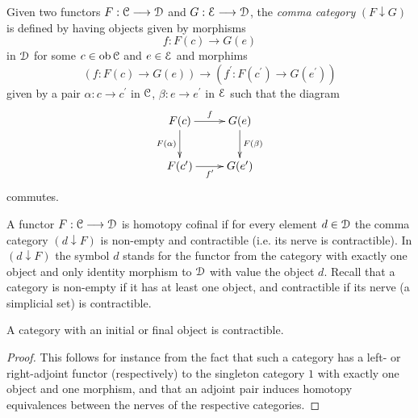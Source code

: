     \begin{defn}\label{def_comma_category}
      Given two functors $F:\mathcal{C} \longrightarrow \mathcal{D}$ and $G: \mathcal{E} \longrightarrow \mathcal{D}$, the \emph{comma category} $(F \downarrow G)$ is defined by having objects given by morphisms 
      \begin{displaymath}
        f \colon F(c) \to G(e)
      \end{displaymath}
      in $\mathcal{D}$ for some $c \in \operatorname{ob} \mathcal{C}$ and $e \in \mathcal{E}$ and morphims 
      \begin{displaymath}
        (f \colon F(c) \to G(e)) \to (f^\prime \colon F(c^\prime) \to G(e^\prime) )
      \end{displaymath}
      given by a pair $\alpha \colon c \to c^\prime$ in $\mathcal{C}$, $\beta \colon e \to e^\prime$ in $\mathcal{E}$ such that the diagram
      \begin{displaymath}
          \xymatrix{
            F(c)
              \ar[r]^{f}
              \ar[d]_{F(\alpha)}
            &
            G(e)
              \ar[d]^{F(\beta)}
            \\
            F(c^\prime) 
              \ar[r]_{f^\prime}
            &
            G(e^\prime)
          }
      \end{displaymath}
      commutes.
    \end{defn}
    \begin{defn}\label{def_homotopy_cofinal}
      A functor $F: \mathcal{C} \longrightarrow \mathcal{D}$ is homotopy cofinal if for every element $d \in
      \mathcal{D}$ the comma category $(d \downarrow F)$ is non-empty and contractible
      (i.e. its nerve is contractible).  In $(d \downarrow F)$ the symbol $d$
      stands for the functor from the category with exactly one object and only
      identity morphism to $\mathcal{D}$ with value the object $d$.  Recall that a
      category is non-empty if it has at least one object, and contractible if
      its nerve (a simplicial set) is contractible.
    \end{defn}
    \begin{lem}\label{lem_category_contractible_if_has_initial_object}
      A category with an initial or final object is contractible.%
      \begin{proof}
        This follows for instance from the fact that such a category has a left-
        or right-adjoint functor (respectively) to the singleton category $1$ with
        exactly one object and one morphism, and that an adjoint pair induces
        homotopy equivalences between the nerves of the respective categories.
      \end{proof}
    \end{lem}
